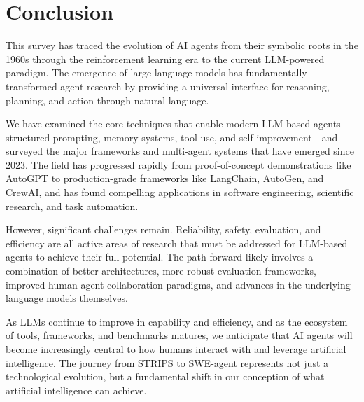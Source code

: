 \documentclass[11pt,a4paper]{article}
\begin{document}
\section{Conclusion}
\label{sec:conclusion}

This survey has traced the evolution of AI agents from their symbolic roots in the 1960s through the reinforcement learning era to the current LLM-powered paradigm. The emergence of large language models has fundamentally transformed agent research by providing a universal interface for reasoning, planning, and action through natural language.

We have examined the core techniques that enable modern LLM-based agents---structured prompting, memory systems, tool use, and self-improvement---and surveyed the major frameworks and multi-agent systems that have emerged since 2023. The field has progressed rapidly from proof-of-concept demonstrations like AutoGPT to production-grade frameworks like LangChain, AutoGen, and CrewAI, and has found compelling applications in software engineering, scientific research, and task automation.

However, significant challenges remain. Reliability, safety, evaluation, and efficiency are all active areas of research that must be addressed for LLM-based agents to achieve their full potential. The path forward likely involves a combination of better architectures, more robust evaluation frameworks, improved human-agent collaboration paradigms, and advances in the underlying language models themselves.

As LLMs continue to improve in capability and efficiency, and as the ecosystem of tools, frameworks, and benchmarks matures, we anticipate that AI agents will become increasingly central to how humans interact with and leverage artificial intelligence. The journey from STRIPS to SWE-agent represents not just a technological evolution, but a fundamental shift in our conception of what artificial intelligence can achieve.



\end{document}
